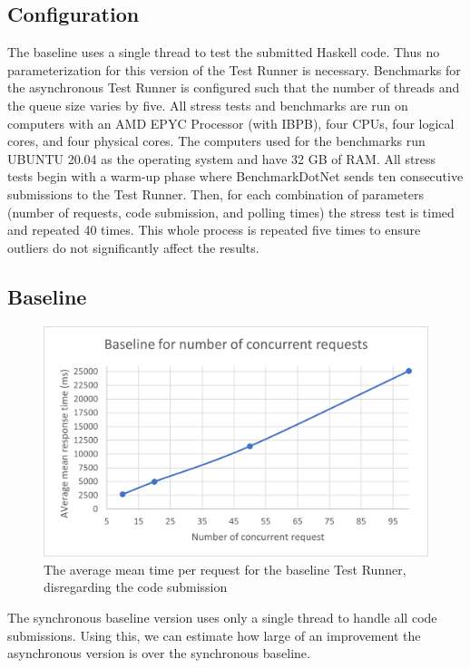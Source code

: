 \subsection{Configuration}
The baseline uses a single thread to test the submitted Haskell code.
Thus no parameterization for this version of the Test Runner is necessary.
Benchmarks for the asynchronous Test Runner is configured such that the number of threads and the queue size varies by five.
All stress tests and benchmarks are run on computers with an AMD EPYC Processor (with IBPB), four CPUs, four logical cores, and four physical cores.
The computers used for the benchmarks run UBUNTU 20.04 as the operating system and have 32 GB of RAM.
All stress tests begin with a warm-up phase where BenchmarkDotNet sends ten consecutive submissions to the Test Runner.
Then, for each combination of parameters (number of requests, code submission, and polling times) the stress test is timed and repeated 40 times.
This whole process is repeated five times to ensure outliers do not significantly affect the results.

\subsection{Baseline}
\begin{figure}
  \centering
  \includegraphics[scale=0.80]{images/baseline.png}
  \caption{The average mean time per request for the baseline Test Runner, disregarding the code submission}
  \label{fig:baseline}
\end{figure}
The synchronous baseline version uses only a single thread to handle all code submissions.
Using this, we can estimate how large of an improvement the asynchronous version is over the synchronous baseline.

